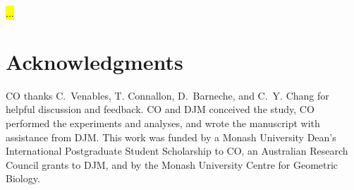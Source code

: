 \documentclass{article}
\begin{document}
\hl{...}



\section*{Acknowledgments}
CO thanks C.~Venables, T. Connallon, D.~Barneche, and C.~Y. Chang for helpful discussion and feedback. CO and DJM conceived the study, CO performed the experiments and analyses, and wrote the manuscript with assistance from DJM. This work was funded by a Monash University Dean's International Postgraduate Student Scholarship to CO, an Australian Research Council grants to DJM, and by the Monash University Centre for Geometric Biology.

\newpage{}


\end{document}
